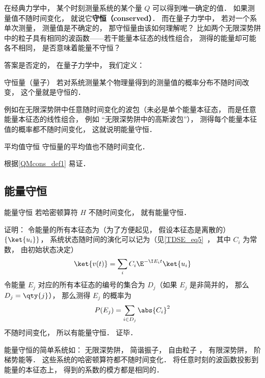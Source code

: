 

在经典力学中， 某个时刻测量系统的某个量 $Q$ 可以得到唯一确定的值． 如果测量值不随时间变化， 就说它\textbf{守恒（conserved）}． 而在量子力学中， 若对一个系单次测量， 测量值是不确定的， 那守恒量由该如何理解呢？ 比如两个无限深势阱中的粒子具有相同的波函数——若干能量本征态的线性组合， 测得的能量却可能各不相同， 是否意味着能量不守恒？

答案是否定的， 在量子力学中， 我们定义：
\begin{definition}{守恒量（量子）}\label{QMcons_def1}
若对系统测量某个物理量得到的测量值的概率分布不随时间改变， 这个量就是守恒的．
\end{definition}

例如在无限深势阱中任意随时间变化的波包（未必是单个能量本征态， 而是任意能量本征态的线性组合， 例如 “无限深势阱中的高斯波包”）， 测得每个能量本征值的概率都不随时间变化， 这就说明能量守恒．

\begin{corollary}{平均值守恒}
守恒量的平均值也不随时间变化．
\end{corollary}
根据\autoref{QMcons_def1} 易证．

\subsection{能量守恒}

\begin{theorem}{能量守恒}
若哈密顿算符 $H$ 不随时间变化， 就有能量守恒．
\end{theorem}
证明： 令能量的所有本征态为（为了方便起见， 假设本征态是离散的） $\{\ket{u_i}\}$， 系统状态随时间的演化可以记为（见\autoref{TDSE_eq5}~， 其中 $C_i$ 为常数， 由初始状态决定）
\begin{equation}
\ket{v(t)} = \sum_i C_i \E^{-\I E_i t} \ket{u_i}
\end{equation}
令能量 $E_j$ 对应的所有本征态的编号的集合为 $D_j$（如果 $E_j$ 是非简并的， 那么 $D_j = \qty{j}$），%
那么测得 $E_j$ 的概率为
\begin{equation}
P(E_j) = \sum_{i \in D_j} \abs{C_i}^2
\end{equation}
不随时间变化， 所以有能量守恒． 证毕．

\begin{example}{}
能量守恒的简单系统如： 无限深势阱， 简谐振子， 自由粒子%
， 有限深势阱， 阶梯势能等． 这些系统的哈密顿算符都不随时间变化． 将任意时刻的波函数投影到能量的本征态上， 得到的系数的模方都是相同的．
\end{example}

